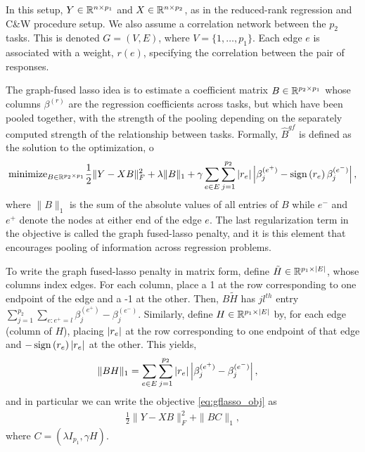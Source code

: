 \documentclass[14pt]{extarticle}
\begin{document}
In this setup, $Y \in \mathbb{R}^{n \times p_{1}}$ and $X \in \mathbb{R}^{n \times
  p_{2}}$, as in the reduced-rank regression and C\&W procedure setup. We also
assume a correlation network between the $p_{2}$ tasks. This is denoted $G =
\left(V, E\right)$, where $V = \{1, \dots, p_{1}\}$. Each edge $e$ is associated
with a weight, $r\left(e\right)$, specifying the correlation between the pair of
responses.

The graph-fused lasso idea is to estimate a coefficient matrix $B \in
\mathbb{R}^{p_{2} \times p_{1}}$ whose columns $\beta^{(r)}$ are the regression
coefficients across tasks, but which have been pooled together, with the
strength of the pooling depending on the separately computed strength of the
relationship between tasks. Formally, $\hat{B}^{gf}$ is defined as the solution
to the optimization,
o\begin{align}
\text{minimize}_{B \in \mathbb{R}^{p_{2} \times p_{1}}} \frac{1}{2}\|Y -
  XB\|_{F}^{2} + \lambda \|B\|_{1} + \gamma \sum_{e \in E} \sum_{j =
    1}^{p_{2}} \left|r_{e}\right|\left|\beta_{j}^{(e^{+})} -
      \mathop\mathrm{sign}\left(r_{e}\right) \beta^{(e^{-})}_{j}\right|, \label{eq:gflasso_obj}
\end{align}
where $\|B\|_{1}$ is the sum of the absolute values of all entries of $B$ while
$e^{-}$ and $e^{+}$ denote the nodes at either end of the edge $e$. The last
regularization term in the objective is called the graph fused-lasso penalty,
and it is this element that encourages pooling of information across regression
problems.

To write the graph fused-lasso penalty in matrix form, define $\tilde{H} \in
\mathbb{R}^{p_{1} \times \left|E\right|}$, whose columns index edges. For each column,
place a 1 at the row corresponding to one endpoint of the edge and a -1 at the
other. Then, $B\tilde{H}$ has $jl^{th}$ entry $\sum_{j = 1}^{p_{2}} \sum_{e :
  e^{+} = l}\beta_{j}^{(e^{+})} - \beta_{j}^{(e^{-})}$. Similarly, define $H \in
\mathbb{R}^{p_{1} \times \left|E\right|}$ by, for each edge (column of $H$), placing
$\left|r_{e}\right|$ at the row corresponding to one endpoint of that edge and
$-\mathop\mathrm{sign}\left(r_{e}\right)\left|r_{e}\right|$ at the other. This yields,
\begin{align*}
\|BH\|_{1} &= \sum_{e \in E}\sum_{j = 1}^{p_{2}}
\left|r_{e}\right|\left|\beta_{j}^{(e^{+})} - \beta_{j}^{(e^{-})}\right|,
\end{align*}
and in particular we can write the objective \ref{eq:gflasso_obj} as
\begin{align}
  \frac{1}{2}\|Y - XB\|_{F}^{2} + \|BC\|_{1}, \label{eq:gflasso_reform}
\end{align}
where $C = \left(\lambda I_{p_{1}}, \gamma H\right)$.
\end{document}
